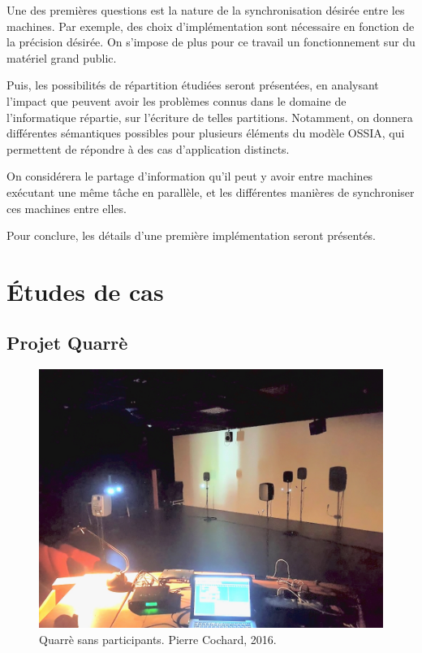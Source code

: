 \documentclass[10pt]{article}
\newcommand\ossia{OSSIA\xspace}
\begin{document}
Une des premières questions est la nature de la synchronisation désirée entre les machines.
Par exemple, des choix d'implémentation sont nécessaire en fonction de la précision désirée. 
On s'impose de plus pour ce travail un fonctionnement sur du matériel grand public.

Puis, les possibilités de répartition étudiées seront présentées, en analysant l'impact que peuvent avoir les problèmes connus dans le domaine de l'informatique répartie, sur l'écriture de telles partitions. 
Notamment, on donnera différentes sémantiques possibles pour plusieurs éléments du modèle \ossia, qui permettent de répondre à des cas d'application distincts. 

On considérera le partage d'information qu'il peut y avoir entre machines exécutant une même tâche en parallèle, et les différentes manières de synchroniser ces machines entre elles.

Pour conclure, les détails d'une première implémentation seront présentés.

\section{Études de cas}

\subsection{Projet Quarrè}

\begin{figure}[h]
    \centering
    \includegraphics[scale=0.2]{images/quarre.jpg}
    \caption[Quarrè]{Quarrè sans participants. Pierre Cochard, 2016.}
    \label{img.quarre}
\end{figure}
\end{document}
